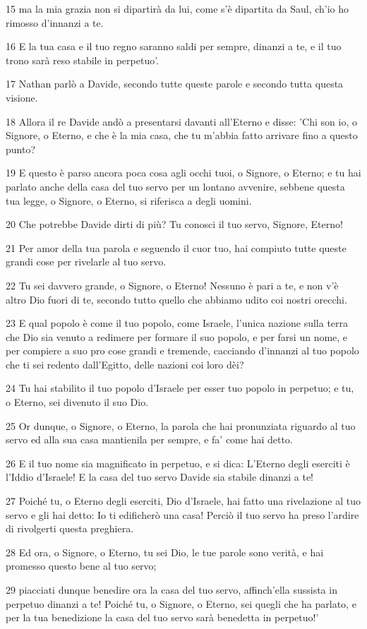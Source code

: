 \par 15 ma la mia grazia non si dipartirà da lui, come s'è dipartita da Saul, ch'io ho rimosso d'innanzi a te.
\par 16 E la tua casa e il tuo regno saranno saldi per sempre, dinanzi a te, e il tuo trono sarà reso stabile in perpetuo'.
\par 17 Nathan parlò a Davide, secondo tutte queste parole e secondo tutta questa visione.
\par 18 Allora il re Davide andò a presentarsi davanti all'Eterno e disse: 'Chi son io, o Signore, o Eterno, e che è la mia casa, che tu m'abbia fatto arrivare fino a questo punto?
\par 19 E questo è parso ancora poca cosa agli occhi tuoi, o Signore, o Eterno; e tu hai parlato anche della casa del tuo servo per un lontano avvenire, sebbene questa tua legge, o Signore, o Eterno, si riferisca a degli uomini.
\par 20 Che potrebbe Davide dirti di più? Tu conosci il tuo servo, Signore, Eterno!
\par 21 Per amor della tua parola e seguendo il cuor tuo, hai compiuto tutte queste grandi cose per rivelarle al tuo servo.
\par 22 Tu sei davvero grande, o Signore, o Eterno! Nessuno è pari a te, e non v'è altro Dio fuori di te, secondo tutto quello che abbiamo udito coi nostri orecchi.
\par 23 E qual popolo è come il tuo popolo, come Israele, l'unica nazione sulla terra che Dio sia venuto a redimere per formare il suo popolo, e per farsi un nome, e per compiere a suo pro cose grandi e tremende, cacciando d'innanzi al tuo popolo che ti sei redento dall'Egitto, delle nazioni coi loro dèi?
\par 24 Tu hai stabilito il tuo popolo d'Israele per esser tuo popolo in perpetuo; e tu, o Eterno, sei divenuto il suo Dio.
\par 25 Or dunque, o Signore, o Eterno, la parola che hai pronunziata riguardo al tuo servo ed alla sua casa mantienila per sempre, e fa' come hai detto.
\par 26 E il tuo nome sia magnificato in perpetuo, e si dica: L'Eterno degli eserciti è l'Iddio d'Israele! E la casa del tuo servo Davide sia stabile dinanzi a te!
\par 27 Poiché tu, o Eterno degli eserciti, Dio d'Israele, hai fatto una rivelazione al tuo servo e gli hai detto: Io ti edificherò una casa! Perciò il tuo servo ha preso l'ardire di rivolgerti questa preghiera.
\par 28 Ed ora, o Signore, o Eterno, tu sei Dio, le tue parole sono verità, e hai promesso questo bene al tuo servo;
\par 29 piacciati dunque benedire ora la casa del tuo servo, affinch'ella sussista in perpetuo dinanzi a te! Poiché tu, o Signore, o Eterno, sei quegli che ha parlato, e per la tua benedizione la casa del tuo servo sarà benedetta in perpetuo!'

